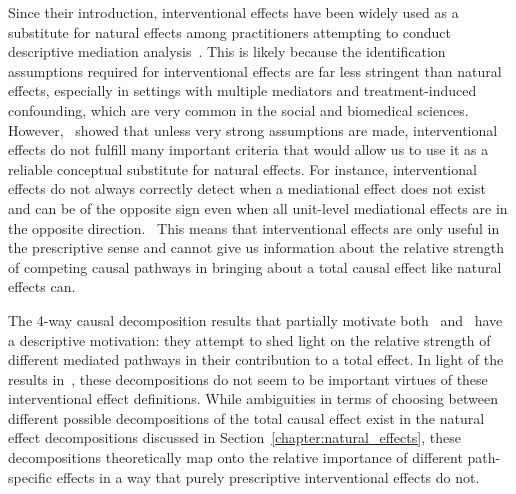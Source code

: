 Since their introduction, interventional effects have been widely used as a substitute for natural effects 
among practitioners attempting to conduct descriptive mediation analysis~\citep{miles2023}.
This is likely because the identification 
assumptions required for interventional effects are far less stringent than natural effects, especially in 
settings with multiple mediators and treatment-induced confounding, which are very common in the social and
biomedical sciences. However,~\cite{miles2023} showed that unless very strong assumptions are made, 
interventional effects do not fulfill many important criteria that would allow us to use it as a reliable
conceptual substitute for natural effects. For instance, interventional effects do not always correctly 
detect when a mediational effect does not exist and can be of the opposite sign even when all unit-level
mediational effects are in the opposite direction.~\citep{miles2023} This means that interventional effects
are only useful in the prescriptive sense and cannot give us information about the relative strength of 
competing causal pathways in bringing about a total causal effect like natural effects can. 

The 4-way causal decomposition results that partially motivate both~\cite{linvanderweele2017} 
and~\cite{vansteelandtdaniel2017} have a descriptive motivation: they attempt to shed light on 
the relative strength of different mediated pathways in their contribution to a total effect. In light of 
the results in~\cite{miles2023}, these decompositions do not seem to be important virtues of these 
interventional effect definitions. While ambiguities in terms of choosing between different possible 
decompositions of the total causal effect exist in the natural effect decompositions discussed in 
Section~\ref{chapter:natural_effects}, these decompositions theoretically map onto the relative 
importance of different path-specific effects in a way that purely prescriptive interventional effects
do not.

